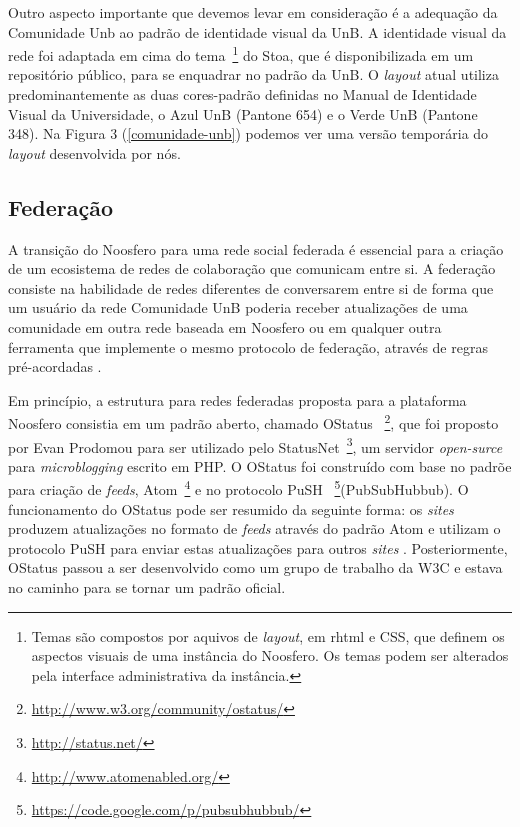 
Outro aspecto importante que devemos levar em consideração é a adequação da
Comunidade Unb ao padrão de identidade visual da UnB.
A identidade visual da rede foi adaptada em cima do tema~\footnote{Temas são
compostos por aquivos de \textit{layout}, em rhtml e CSS, que definem os aspectos
visuais de uma instância do Noosfero. Os temas podem ser alterados pela interface
administrativa da instância.} do Stoa, que é disponibilizada em um repositório
público, para se enquadrar no padrão da UnB.
%
O \textit{layout} atual utiliza predominantemente as duas cores-padrão definidas
no Manual de Identidade Visual da Universidade\cite{visualUnB}, o Azul UnB
(Pantone 654) e o Verde UnB (Pantone 348). Na Figura 3 (\ref{comunidade-unb})
podemos ver uma versão temporária do \textit{layout} desenvolvida por nós.


\subsection{Federação}

A transição do Noosfero para uma rede social federada é essencial para a criação
de um ecosistema de redes de colaboração que comunicam entre si. A federação
consiste na habilidade de redes diferentes de conversarem entre si de forma que
um usuário da rede Comunidade UnB poderia receber atualizações de uma comunidade
em outra rede baseada em Noosfero ou em qualquer outra ferramenta que implemente
o mesmo protocolo de federação, através de regras pré-acordadas
\cite{prodomou2010}.

Em princípio, a estrutura para redes federadas proposta para a plataforma Noosfero
consistia em um padrão aberto, chamado OStatus
~\footnote{\url{http://www.w3.org/community/ostatus/}}, que foi proposto
por Evan Prodomou para ser utilizado pelo StatusNet~\footnote{\url{
http://status.net/}}, um servidor  \textit{open-surce} para
\textit{microblogging} escrito em PHP.
%
O OStatus foi construído com base no padrõe para criação de \textit{feeds},
Atom~\footnote{\url{http://www.atomenabled.org/}} e no protocolo PuSH
~\footnote{\url{https://code.google.com/p/pubsubhubbub/}}(PubSubHubbub).
O funcionamento do OStatus pode ser resumido da seguinte forma:
os \textit{sites} produzem atualizações no formato de \textit{feeds} através
do padrão Atom e utilizam o protocolo PuSH para enviar estas atualizações
para outros \textit{sites} \cite{OStatusBasics}.
%
Posteriormente, OStatus passou a ser desenvolvido como um grupo de trabalho
da W3C e estava no caminho para se tornar um padrão oficial. 

